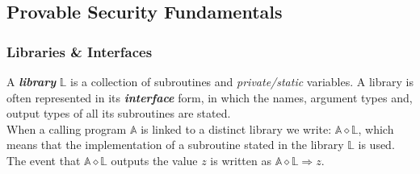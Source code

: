 \documentclass{article}
\begin{document}
\begin{adjustwidth}{2em}{}
			\subsection{Provable Security Fundamentals}
			\begin{adjustwidth}{2em}{}
				\subsubsection{Libraries \& Interfaces}
				\begin{adjustwidth}{2em}{4em}
					A \textbf{\textit{library}} $\mathbb{L}$ is a collection of subroutines and \textit{private/static} variables. A library is often represented in its \textbf{\textit{interface}} form, in which the names, argument types and, output types of all its subroutines are stated. \\
					When a calling program $\mathbb{A}$ is linked to a distinct library we write: $\mathbb{A} \diamond \mathbb{L}$, which means that the implementation of a subroutine stated in the library $\mathbb{L}$ is used. The event that $\mathbb{A} \diamond \mathbb{L}$ outputs the value $z$ is written as $\mathbb{A} \diamond \mathbb{L} \Rightarrow z$.

\end{adjustwidth}
\end{adjustwidth}
\end{adjustwidth}
\end{document}
